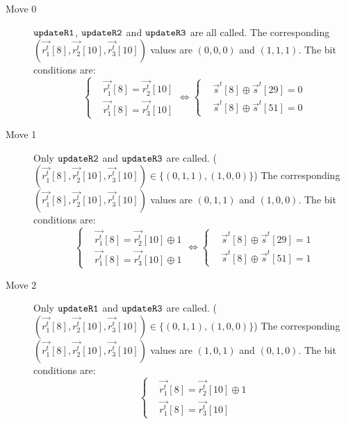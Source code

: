 \begin{description}
  \item[Move 0] $\tt{updateR1}$, $\tt{updateR2}$ and $\tt{updateR3}$ are all called.
  The corresponding $(\vec{r_1^t}[8],\vec{r_2^t}[10],\vec{r_3^t}[10])$ values are $(0,0,0)$ and $(1,1,1)$.
  The bit conditions are:
  \begin{equation}\label{eq:Move0BitCondition}
    \left\{
    \begin{aligned}
    &\vec{r_1^t}[8]=\vec{r_2^t}[10]\\
    &\vec{r_1^t}[8]=\vec{r_3^t}[10]
    \end{aligned}
    \right.
    \Leftrightarrow
    \left\{
    \begin{aligned}
    &\vec{s}^t[8]\oplus \vec{s}^t[29]=0\\
    &\vec{s}^t[8]\oplus \vec{s}^t[51]=0
    \end{aligned}
    \right.
  \end{equation}
  \item[Move 1] Only $\tt{updateR2}$ and $\tt{updateR3}$ are called. ($(\vec{r_1^t}[8],\vec{r_2^t}[10],\vec{r_3^t}[10])\in \{(0,1,1),(1,0,0)\}$)
  The corresponding $(\vec{r_1^t}[8],\vec{r_2^t}[10],\vec{r_3^t}[10])$ values are $(0,1,1)$ and $(1,0,0)$.
  The bit conditions are:
  \begin{equation}\label{eq:Move1BitCondition}
    \left\{
    \begin{aligned}
    &\vec{r_1^t}[8]=\vec{r_2^t}[10]\oplus 1\\
    &\vec{r_1^t}[8]=\vec{r_3^t}[10]\oplus 1
    \end{aligned}
    \right.
    \Leftrightarrow
    \left\{
    \begin{aligned}
    &\vec{s}^t[8] \oplus \vec{s}^t[29]=1\\
    &\vec{s}^t[8] \oplus \vec{s}^t[51]=1
    \end{aligned}
    \right.
  \end{equation}
  \item[Move 2] Only $\tt{updateR1}$ and $\tt{updateR3}$ are called. ($(\vec{r_1^t}[8],\vec{r_2^t}[10],\vec{r_3^t}[10])\in \{(0,1,1),(1,0,0)\}$)
  The corresponding $(\vec{r_1^t}[8],\vec{r_2^t}[10],\vec{r_3^t}[10])$ values are $(1,0,1)$ and $(0,1,0)$.
  The bit conditions are:
  \begin{equation}\label{eq:Move2BitCondition}
    \left\{
    \begin{aligned}
    &\vec{r_1^t}[8]=\vec{r_2^t}[10]\oplus 1\\
    &\vec{r_1^t}[8]=\vec{r_3^t}[10]

\end{aligned}
\end{equation}
\end{description}
